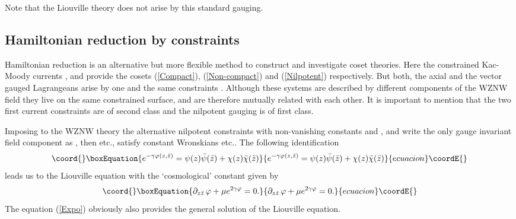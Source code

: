 \documentclass[a4paper,12]{article}
\begin{document}
Note that the Liouville theory does not arise by this standard
gauging.

\subsection{Hamiltonian reduction by constraints}

Hamiltonian reduction is an alternative but more flexible method to
construct and investigate coset theories. Here the constrained
Kac-Moody currents \coordHE{}, \coordHE{} and \coordHE{} provide the cosets (\ref{Compact}), (\ref{Non-compact}) and
(\ref{Nilpotent}) respectively. But both, the axial and the vector
gauged Lagrangeans arise by one and the same constraints 
\cite{FJW, FJW2}.  Although these systems are described by different
components of the WZNW field they live on the same constrained surface, and
are therefore mutually related with each other. It is important to
mention that the two first current constraints are of second class and
the nilpotent gauging is of first class.

Imposing to the \coordHE{} WZNW theory the alternative nilpotent
constraints \coordHE{} with non-vanishing
constants \myHighlight{$\rho$}\coordHE{} and \myHighlight{$\bar\rho$}\coordHE{}, and write the only gauge
invariant field component as \coordHE{},
then \coordHE{} etc.,
satisfy constant Wronskians 
\coordHE{} etc..
The following identification
\begin{equation}\coord{}\boxEquation{\label{Expo}
e^{-\gamma\varphi(z, \bar z)}=\psi(z)\bar\psi(\bar z)+\chi(z)\bar\chi(\bar z)
}{e^{-\gamma\varphi(z, \bar z)}=\psi(z)\bar\psi(\bar z)+\chi(z)\bar\chi(\bar z)
}{ecuacion}\coordE{}\end{equation}
leads us to the Liouville equation with the `cosmological' constant given by
\coordHE{}
\begin{equation}\coord{}\boxEquation{\label{Lio}
\partial_{z\bar z}\, \varphi +\mu e^{2\gamma\varphi}=0.
}{\partial_{z\bar z}\, \varphi +\mu e^{2\gamma\varphi}=0.
}{ecuacion}\coordE{}\end{equation}
The equation (\ref{Expo}) obviously also provides the general 
solution of the Liouville equation. 
\end{document}
